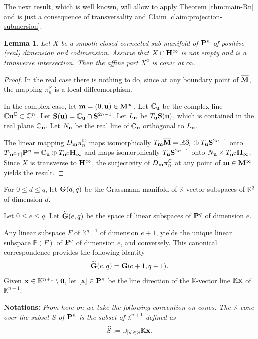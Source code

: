 \documentclass[11pt]{amsart}
\newtheorem{lemma}[theorem]{Lemma}
\newcommand{\field}[1]{\mathbb{#1}}
\newcommand{\C}{\field{C}}
\newcommand{\K}{\field{K}}
\newcommand{\R}{\field{R}}
\newcommand{\wh}[1]{\widehat{#1}}
\newcommand{\wt}[1]{\widetilde{#1}}
\newcommand{\bbo}{{\bf 0}}
\newcommand{\bG}{{\bf G}}
\newcommand{\bH}{{\bf H}}
\newcommand{\bm}{{\bf m}}
\newcommand{\bM}{{\bf M}}
\newcommand{\bMbar}{\overline{\bf M}}
\newcommand{\bP}{{\bf P}}
\newcommand{\bS}{{\bf S}}
\newcommand{\bu}{{\bf u}}
\newcommand{\bx}{{\bf x}}
\newcommand{\Cn}{{\C^n}}
\newcommand{\dd}{{\partial}}
\numberwithin{equation}{section}
\numberwithin{equation}{section}
\begin{document}
\medskip
The next result, which is well known, will allow to apply Theorem 
\ref{thm:main-Rn} and is just a consequence of transversality and Claim 
\ref{claim:projection-submersion}.
%
%  
\begin{lemma}\label{lem:transverse}
Let $X$ be a smooth closed connected sub-manifold of $\bP^n$ of positive 
(real) dimension and codimension. Assume that $X\cap \bH^\infty$ is not 
empty and 
is a transverse intersection. Then the affine part $X^a$ 
is conic at $\infty$.
\end{lemma}
%
%
\begin{proof}
In the real case there is nothing to do, since at any boundary point
of $\bMbar$, the mapping $\pi_n^\R$ is a local diffeomorphism.

In the complex case, let $\bm = (0,\bu) \in \bM^\infty$. 
Let $\C_\bu$ be the complex line $\C\bu^\C \subset \Cn$. 
Let $\bS(\bu) = \C_\bu \cap 
\bS^{2n-1}$. Let $L_\bu$ be $T_\bu \bS(\bu)$, which is contained in the real
plane $\C_\bu$. Let $N_\bu$ be the real line of $\C_\bu$ orthogonal to 
$L_\bu$.  

The linear mapping $D_\bm \pi_n^\C$ maps isomorphically $T_\bm \bMbar = 
\R\dd_r \oplus T_\bu \bS^{2n-1}$ onto $T_{[\bu^\C:0]} \bP^n = \C_\bu \oplus 
T_{\bu^\C}\bH_\infty$ and maps isomorphically $T_\bu\bS^{2n-1}$ onto
$N_\bu\times T_{\bu^\C}\bH_\infty$. Since $X$ is transverse to 
$\bH^\infty$, the surjectivity of $D_\bm\pi_n^\C$ at any point of 
$\bm\in \bM^\infty$ yields the result.
\end{proof}
%
%

\bigskip
For $0 \leq d \leq q$, let 
$\bG (d,q)$ be the Grassmann manifold of $\K$-vector subspaces of
$\K^q$ of dimension $d$. 

Let $0 \leq e \leq q$. Let $\wt{\bG}(e,q)$ be the space of linear 
subspaces of $\bP^q$ of dimension $e$. 

Any linear subspace $F$ of $\K^{q+1}$ of dimension $e+1$, yields 
the unique linear subspace $\field{P}(F)$ of $\bP^q$ of dimension $e$, and 
conversely. This canonical correspondence provides the 
following identity
$$
\wt{\bG}(e,q) = \bG(e+1,q+1).
$$  
Given $\bx\in\K^{n+1}\setminus \bbo$, let $[\bx] \in \bP^n$ be the 
line direction of the $\K$-vector line $\K\bx$ of $\K^{n+1}$.

\bigskip\noindent
{\bf Notations:} \em From here on we take the following convention on 
cones: 
The $\K$-cone over the subset $S$ of $\bP^n$ is the subset of 
$\K^{n+1}$ defined as
$$
\wh{S} := \cup_{[\bx]\in S} \K\bx.
$$
\em
\end{document}
